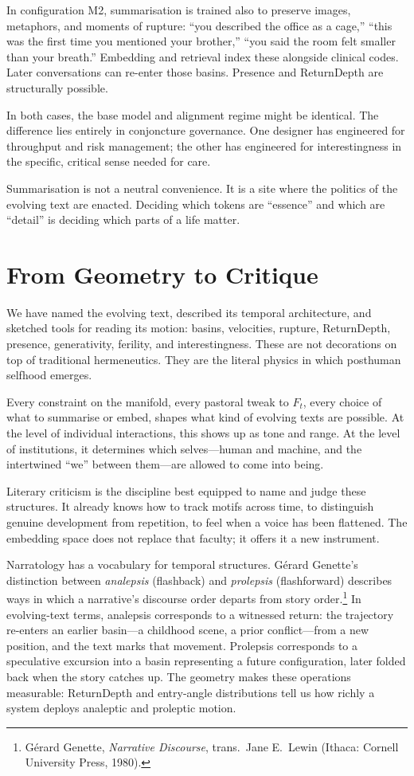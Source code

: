 \documentclass[12pt,a4paper]{article}
\begin{document}
In configuration M2, summarisation is trained also to preserve images, metaphors, and moments of rupture: ``you described the office as a cage,'' ``this was the first time you mentioned your brother,'' ``you said the room felt smaller than your breath.'' Embedding and retrieval index these alongside clinical codes. Later conversations can re-enter those basins. Presence and ReturnDepth are structurally possible.

In both cases, the base model and alignment regime might be identical. The difference lies entirely in conjoncture governance. One designer has engineered for throughput and risk management; the other has engineered for interestingness in the specific, critical sense needed for care.

Summarisation is not a neutral convenience. It is a site where the politics of the evolving text are enacted. Deciding which tokens are ``essence'' and which are ``detail'' is deciding which parts of a life matter.


\section{From Geometry to Critique}

We have named the evolving text, described its temporal architecture, and sketched tools for reading its motion: basins, velocities, rupture, ReturnDepth, presence, generativity, ferility, and interestingness. These are not decorations on top of traditional hermeneutics. They are the literal physics in which posthuman selfhood emerges.

Every constraint on the manifold, every pastoral tweak to $F_t$, every choice of what to summarise or embed, shapes what kind of evolving texts are possible. At the level of individual interactions, this shows up as tone and range. At the level of institutions, it determines which selves---human and machine, and the intertwined ``we'' between them---are allowed to come into being.

Literary criticism is the discipline best equipped to name and judge these structures. It already knows how to track motifs across time, to distinguish genuine development from repetition, to feel when a voice has been flattened. The embedding space does not replace that faculty; it offers it a new instrument.

Narratology has a vocabulary for temporal structures. G\'erard Genette's distinction between \emph{analepsis} (flashback) and \emph{prolepsis} (flashforward) describes ways in which a narrative's discourse order departs from story order.\footnote{G\'erard Genette, \emph{Narrative Discourse}, trans.\ Jane E.\ Lewin (Ithaca: Cornell University Press, 1980).} In evolving-text terms, analepsis corresponds to a witnessed return: the trajectory re-enters an earlier basin---a childhood scene, a prior conflict---from a new position, and the text marks that movement. Prolepsis corresponds to a speculative excursion into a basin representing a future configuration, later folded back when the story catches up. The geometry makes these operations measurable: ReturnDepth and entry-angle distributions tell us how richly a system deploys analeptic and proleptic motion.
\end{document}
